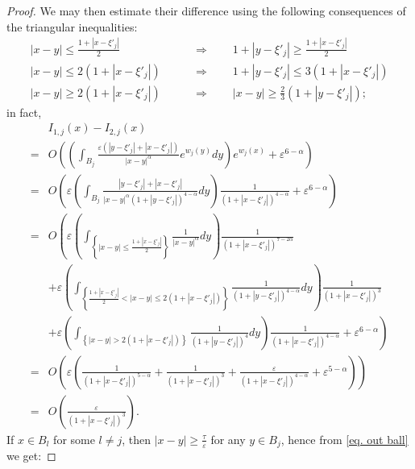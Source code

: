 \documentclass[11pt]{article}
\begin{document}
\begin{proof}
We may then estimate their difference using the following consequences of the triangular inequalities:
\begin{align}
\nonumber|x-y|\le\frac{1+\left|x-\xi'_j\right|}2\qquad&\Rightarrow\qquad1+\left|y-\xi'_j\right|\ge\frac{1+\left|x-\xi'_j\right|}2\\
\nonumber|x-y|\le2\left(1+\left|x-\xi'_j\right|\right)\qquad&\Rightarrow\qquad1+\left|y-\xi'_j\right|\le3\left(1+\left|x-\xi'_j\right|\right)\\
\label{triang}|x-y|\ge2\left(1+\left|x-\xi'_j\right|\right)\qquad&\Rightarrow\qquad|x-y|\ge\frac23\left(1+\left|y-\xi'_j\right|\right);
\end{align}
in fact,
\begin{align}
\nonumber&I_{1,j}(x)-I_{2,j}(x)\\
\nonumber=&O\left(\left(\int_{B_j}\frac{\varepsilon\left(\left|y-\xi'_j\right|+\left|x-\xi'_j\right|\right)}{|x-y|^\alpha}e^{w_j(y)}dy\right)e^{w_j(x)}+\varepsilon^{6-\alpha}\right)\\
\nonumber=&O\left(\varepsilon\left(\int_{B_j}\frac{\left|y-\xi'_j\right|+\left|x-\xi'_j\right|}{|x-y|^\alpha\left(1+\left|y-\xi'_j\right|\right)^{4-\alpha}}dy\right)\frac1{\left(1+\left|x-\xi'_j\right|\right)^{4-\alpha}}+\varepsilon^{6-\alpha}\right)\\
\nonumber=&O\left(\varepsilon\left(\int_{\left\{|x-y|\le\frac{1+\left|x-\xi'_j\right|}2\right\}}\frac1{|x-y|^\alpha}dy\right)\frac1{\left(1+\left|x-\xi'_j\right|\right)^{7-2\alpha}}\right.\\
\nonumber&\left.+\varepsilon\left(\int_{\left\{\frac{1+\left|x-\xi'_j\right|}2<|x-y|\le2\left(1+\left|x-\xi'_j\right|\right)\right\}}\frac1{\left(1+\left|y-\xi'_j\right|\right)^{4-\alpha}}dy\right)\frac1{\left(1+\left|x-\xi'_j\right|\right)^3}\right.\\
\nonumber&\left.+\varepsilon\left(\int_{\left\{|x-y|>2\left(1+\left|x-\xi'_j\right|\right)\right\}}\frac1{\left(1+\left|y-\xi'_j\right|\right)^4}dy\right)\frac1{\left(1+\left|x-\xi'_j\right|\right)^{4-\alpha}}+\varepsilon^{6-\alpha}\right)\\
\nonumber=&O\left(\varepsilon\left(\frac1{\left(1+\left|x-\xi'_j\right|\right)^{5-\alpha}}+\frac1{\left(1+\left|x-\xi'_j\right|\right)^3}+\frac\varepsilon{\left(1+\left|x-\xi'_j\right|\right)^{4-\alpha}}+\varepsilon^{5-\alpha}\right)\right)\\
\label{i1j-i2j}=&O\left(\frac{\varepsilon}{\left(1+\left|x-\xi'_j\right|\right)^3}\right).
\end{align}
If $x\in B_l$ for some $l\ne j$, then $|x-y|\ge\frac\tau\varepsilon$ for any $y\in B_j$, hence from \eqref{eq. out ball} we get:

\end{proof}
\end{document}
